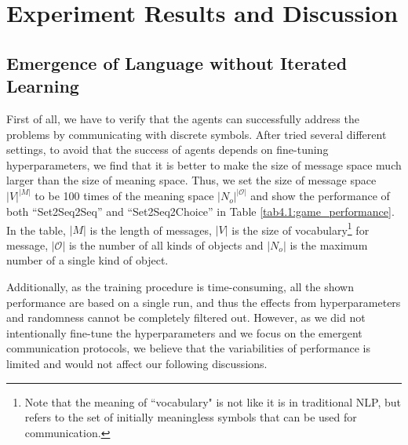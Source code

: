\chapter{Experiment Results and Discussion}
\label{ch4:results_analysis}


\section{Emergence of Language without Iterated Learning}
\label{sec4.1:emergence}

First of all, we have to verify that the agents can successfully address the problems by communicating with discrete symbols. After tried several different settings, to avoid that the success of agents depends on fine-tuning hyperparameters, we find that it is better to make the size of message space much larger than the size of meaning space. Thus, we set the size of message space $|V|^{|M|}$ to be 100 times of the meaning space $|N_{o}|^{|\mathcal{O}|}$ and show the performance of both ``Set2Seq2Seq'' and ``Set2Seq2Choice'' in Table \ref{tab4.1:game_performance}. In the table, $|M|$ is the length of messages, $|V|$ is the size of vocabulary\footnote{Note that the meaning of ``vocabulary" is not like it is in traditional NLP, but refers to the set of initially meaningless symbols that can be used for communication.} for message, $|\mathcal{O}|$ is the number of all kinds of objects and $|N_o|$ is the maximum number of a single kind of object.

Additionally, as the training procedure is time-consuming, all the shown performance are based on a single run, and thus the effects from hyperparameters and randomness cannot be completely filtered out. However, as we did not intentionally fine-tune the hyperparameters and we focus on the emergent communication protocols, we believe that the variabilities of performance is limited and would not affect our following discussions. 

